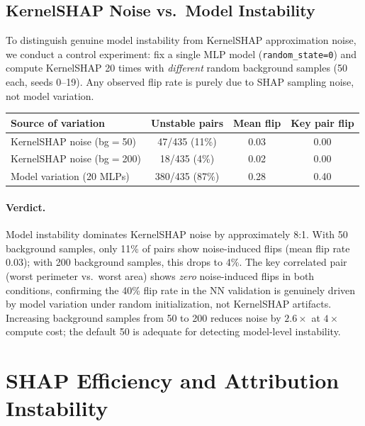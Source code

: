\documentclass{article}
\begin{document}
\subsection{KernelSHAP Noise vs.\ Model Instability}

To distinguish genuine model instability from KernelSHAP approximation
noise, we conduct a control experiment: fix a single MLP model
(\texttt{random\_state=0}) and compute KernelSHAP 20 times with
\emph{different} random background samples (50 each, seeds 0--19).
Any observed flip rate is purely due to SHAP sampling noise, not
model variation.

\begin{center}
\small
\begin{tabular}{@{}lccc@{}}
\toprule
Source of variation & Unstable pairs & Mean flip & Key pair flip \\
\midrule
KernelSHAP noise (bg$=$50) & 47/435 (11\%) & 0.03 & 0.00 \\
KernelSHAP noise (bg$=$200) & 18/435 (4\%) & 0.02 & 0.00 \\
Model variation (20 MLPs) & 380/435 (87\%) & 0.28 & 0.40 \\
\bottomrule
\end{tabular}
\end{center}

\paragraph{Verdict.}
Model instability dominates KernelSHAP noise by approximately 8:1.
With 50 background samples, only 11\% of pairs show noise-induced
flips (mean flip rate 0.03); with 200 background samples, this drops
to 4\%. The key correlated pair (worst perimeter vs.\ worst area)
shows \emph{zero} noise-induced flips in both conditions, confirming
the 40\% flip rate in the NN validation is genuinely driven by model
variation under random initialization, not KernelSHAP artifacts.
Increasing background samples from 50 to 200 reduces noise by
$2.6\times$ at $4\times$ compute cost; the default 50 is adequate
for detecting model-level instability.


\section{SHAP Efficiency and Attribution Instability}
\label{sec:efficiency-instability}
\end{document}
